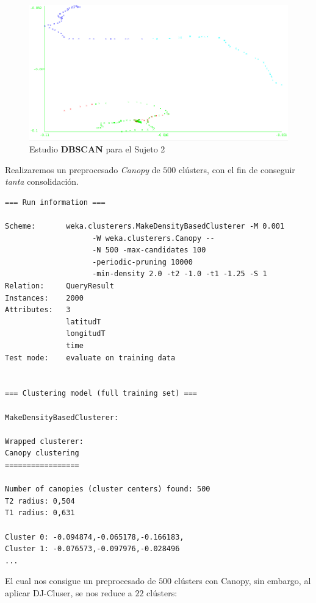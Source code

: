 \documentclass[a4paper, 12pt]{article}
\begin{document}
\begin{figure}[H]
	\includegraphics[scale=.5]{../comparativa/djClusterPruebaCanopySin.png}
	\caption{Estudio \textbf{DBSCAN} para el Sujeto 2}
\end{figure}


Realizaremos un preprocesado \textit{Canopy} de $500$ cl\'usters, con el fin de conseguir \textit{tanta} consolidaci\'on.\\

\begin{verbatim}
=== Run information ===

Scheme:       weka.clusterers.MakeDensityBasedClusterer -M 0.001 
					-W weka.clusterers.Canopy -- 
					-N 500 -max-candidates 100 
					-periodic-pruning 10000 
					-min-density 2.0 -t2 -1.0 -t1 -1.25 -S 1
Relation:     QueryResult
Instances:    2000
Attributes:   3
              latitudT
              longitudT
              time
Test mode:    evaluate on training data


=== Clustering model (full training set) ===

MakeDensityBasedClusterer: 

Wrapped clusterer: 
Canopy clustering
=================

Number of canopies (cluster centers) found: 500
T2 radius: 0,504     
T1 radius: 0,631     

Cluster 0: -0.094874,-0.065178,-0.166183,
Cluster 1: -0.076573,-0.097976,-0.028496
...
\end{verbatim}

El cual nos consigue un preprocesado de $500$ cl\'usters con Canopy, sin embargo, al aplicar DJ-Cluser, se nos reduce a $22$ cl\'usters:\\
\end{document}
